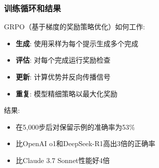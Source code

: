 \documentclass[aspectratio=169]{beamer}
\begin{document}
\begin{frame}
	\frametitle{训练循环和结果}
	\begin{block}{GRPO（基于梯度的奖励策略优化）如何工作:}
		\begin{itemize}
			\item \textbf{生成}: 使用采样为每个提示生成多个完成
			\item \textbf{评估}: 对每个完成运行奖励检查
			\item \textbf{更新}: 计算优势并反向传播信号
			\item \textbf{重复}: 模型精细策略以最大化奖励
		\end{itemize}
	\end{block}
	\begin{block}{结果:}
		\begin{itemize}
			\item 在5,000步后对保留示例的准确率为53\%
			\item 比OpenAI o1和DeepSeek-R1高出3倍的正确率
			\item 比Claude 3.7 Sonnet性能好4倍
		\end{itemize}
	\end{block}
\end{frame}
\end{document}
